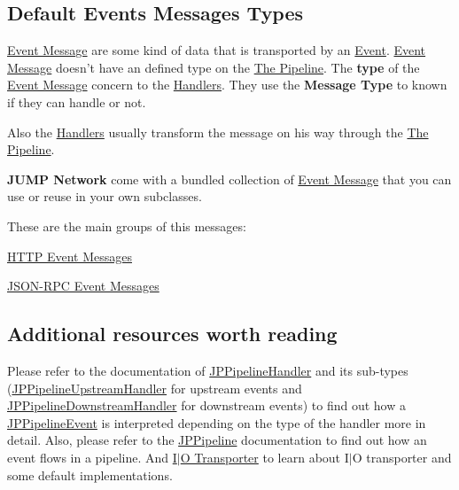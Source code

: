 \subsection*{Default Events Messages Types}

\hyperlink{a00006}{Event Message} are some kind of data that is transported by an \hyperlink{a00005}{Event}. \hyperlink{a00006}{Event Message} doesn't have an defined type on the \hyperlink{a00001}{The Pipeline}. The {\bfseries type} of the \hyperlink{a00006}{Event Message} concern to the \hyperlink{a00003}{Handlers}. They use the {\bfseries Message Type} to known if they can handle or not. 

Also the \hyperlink{a00003}{Handlers} usually transform the message on his way through the \hyperlink{a00001}{The Pipeline}. 

{\bfseries JUMP Network} come with a bundled collection of \hyperlink{a00006}{Event Message} that you can use or reuse in your own subclasses.\par
 These are the main groups of this messages:
\begin{DoxyItemize}
\item \hyperlink{a00007}{HTTP Event Messages}
\item \hyperlink{a00008}{JSON-\/RPC Event Messages} 
\end{DoxyItemize}

\subsection*{Additional resources worth reading}

Please refer to the documentation of \hyperlink{a00029}{JPPipelineHandler} and its sub-\/types (\hyperlink{a00035}{JPPipelineUpstreamHandler} for upstream events and \hyperlink{a00021}{JPPipelineDownstreamHandler} for downstream events) to find out how a \hyperlink{a00023}{JPPipelineEvent} is interpreted depending on the type of the handler more in detail. Also, please refer to the \hyperlink{a00019}{JPPipeline} documentation to find out how an event flows in a pipeline. And \hyperlink{a00002}{I$|$O Transporter} to learn about I$|$O transporter and some default implementations. 